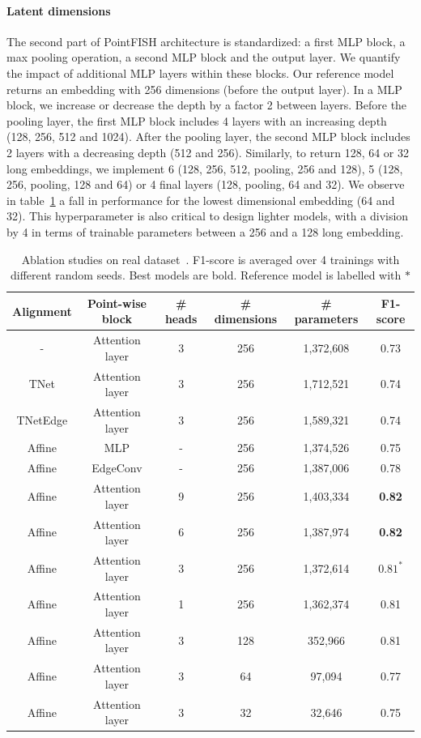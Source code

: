 
\paragraph{Latent dimensions}

The second part of PointFISH architecture is standardized: a first MLP block, a max pooling operation, a second MLP block and the output layer.
We quantify the impact of additional MLP layers within these blocks.
Our reference model returns an embedding with 256 dimensions (before the output layer).
In a MLP block, we increase or decrease the depth by a factor 2 between layers.
Before the pooling layer, the first MLP block includes 4 layers with an increasing depth (128, 256, 512 and 1024).
After the pooling layer, the second MLP block includes 2 layers with a decreasing depth (512 and 256).
Similarly, to return 128, 64 or 32 long embeddings, we implement 6 (128, 256, 512, pooling, 256 and 128), 5 (128, 256, pooling, 128 and 64) or 4 final layers (128, pooling, 64 and 32).
We observe in table~\ref{table:ablation} a fall in performance for the lowest dimensional embedding (64 and 32).
This hyperparameter is also critical to design lighter models, with a division by 4 in terms of trainable parameters between a 256 and a 128 long embedding.

\begin{table}[h]
	\centering
	\begin{tabular}{| c | c | c | c | c | c |}
		\hline
		Alignment & Point-wise block & \# heads & \# dimensions & \# parameters & F1-score \\
		\hline\hline
		- & Attention layer & 3 & 256 & 1,372,608 & 0.73\\
		TNet & Attention layer & 3 & 256 & 1,712,521 & 0.74\\
		TNetEdge & Attention layer & 3 & 256 & 1,589,321 & 0.74\\
		\hline\hline
		Affine & MLP & - & 256 & 1,374,526 & 0.75\\
		Affine & EdgeConv & - & 256 & 1,387,006 & 0.78\\
		\hline\hline
		Affine & Attention layer & 9 & 256 & 1,403,334 & \textbf{0.82}\\
		Affine & Attention layer & 6 & 256 & 1,387,974 & \textbf{0.82}\\
		Affine & Attention layer & 3 & 256 & 1,372,614 & $0.81^{\ast}$\\
		Affine & Attention layer & 1 & 256 & 1,362,374 & 0.81\\
		\hline\hline
		Affine & Attention layer & 3 & 128 & 352,966 & 0.81\\
		Affine & Attention layer & 3 & 64 & 97,094 & 0.77\\
		Affine & Attention layer & 3 & 32 & 32,646 & 0.75\\
		\hline
	\end{tabular}
	\caption{Ablation studies on real dataset~\cite{CHOUAIB_2020}.
	F1-score is averaged over 4 trainings with different random seeds.
	Best models are bold.
	Reference model is labelled with $\ast$}
	\label{table:ablation}
\end{table}

